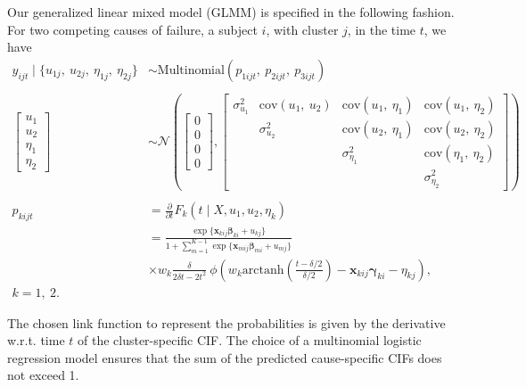 Our generalized linear mixed model (GLMM) is specified in the following
fashion. For two competing causes of failure, a subject \(i\), with
cluster \(j\), in the time \(t\), we have
\begin{align}
  y_{i j t} \mid \{u_{1j},~u_{2j},~\eta_{1j},~\eta_{2j}\}&\sim
  \text{Multinomial}(p_{1ijt},~p_{2ijt},~p_{3ijt})\nonumber\\
  \nonumber\\
  \begin{bmatrix} u_{1}\\u_{2}\\\eta_{1}\\\eta_{2} \end{bmatrix}&\sim
  \mathcal{N} \left(\begin{bmatrix} 0\\0\\0\\0\end{bmatrix},
  \begin{bmatrix}
    \sigma_{u_{1}}^{2}&
    \text{cov}(u_{1},~u_{2})&
    \text{cov}(u_{1},~\eta_{1})&\text{cov}(u_{1},~\eta_{2})\\
    &\sigma_{u_{2}}^{2}&
    \text{cov}(u_{2},~\eta_{1})&\text{cov}(u_{2},~\eta_{2})\\
    &&\sigma_{\eta_{1}}^{2}&\text{cov}(\eta_{1},~\eta_{2})\\
    &&&\sigma_{\eta_{2}}^{2}
  \end{bmatrix}\right)\nonumber\\
  \nonumber\\
  p_{kijt} &=
  \frac{\partial}{\partial t}F_{k} (t \mid X, u_{1}, u_{2}, \eta_{k})
  \nonumber\\
  &= \frac{\exp\{\bm{x}_{kij}\bm{\beta}_{ki} + u_{kj}\}}{
    1 + \sum_{m=1}^{K-1}\exp\{\bm{x}_{mij}\bm{\beta}_{mi} + u_{mj}\}}
  \label{eq:model}\\
  &\times w_{k}\frac{\delta}{2\delta t - 2t^{2}}~
  \phi\left(
    w_{k}
    \text{arctanh}\left(\frac{t-\delta/2}{\delta/2}\right)
    - \bm{x}_{kij}\bm{\gamma}_{ki} - \eta_{kj}
    \right),\nonumber\\ k = 1,~2.\nonumber
\end{align}

The chosen link function to represent the probabilities is given by the
derivative w.r.t. time \(t\) of the cluster-specific CIF. The choice of
a multinomial logistic regression model ensures that the sum of the
predicted cause-specific CIFs does not exceed 1.


